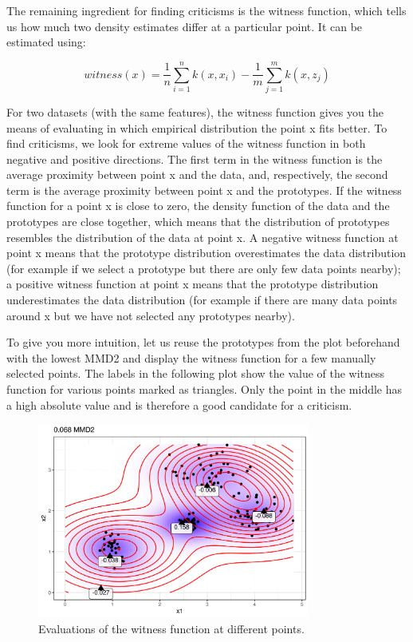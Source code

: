 \documentclass[
  11pt,
]{scrbook}
\begin{document}
The remaining ingredient for finding criticisms is the witness function, which tells us how much two density estimates differ at a particular point.
It can be estimated using:

\[witness(x)=\frac{1}{n}\sum_{i=1}^nk(x,x_i)-\frac{1}{m}\sum_{j=1}^mk(x,z_j)\]

For two datasets (with the same features), the witness function gives you the means of evaluating in which empirical distribution the point x fits better.
To find criticisms, we look for extreme values of the witness function in both negative and positive directions.
The first term in the witness function is the average proximity between point x and the data, and, respectively, the second term is the average proximity between point x and the prototypes.
If the witness function for a point x is close to zero, the density function of the data and the prototypes are close together, which means that the distribution of prototypes resembles the distribution of the data at point x.
A negative witness function at point x means that the prototype distribution overestimates the data distribution (for example if we select a prototype but there are only few data points nearby);
a positive witness function at point x means that the prototype distribution underestimates the data distribution (for example if there are many data points around x but we have not selected any prototypes nearby).

To give you more intuition, let us reuse the prototypes from the plot beforehand with the lowest MMD2 and display the witness function for a few manually selected points.
The labels in the following plot show the value of the witness function for various points marked as triangles.
Only the point in the middle has a high absolute value and is therefore a good candidate for a criticism.

\begin{figure}

{\centering \includegraphics[width=0.8\textwidth]{images/witness-1} 

}

\caption{Evaluations of the witness function at different points.}\label{fig:witness}
\end{figure}
\end{document}
